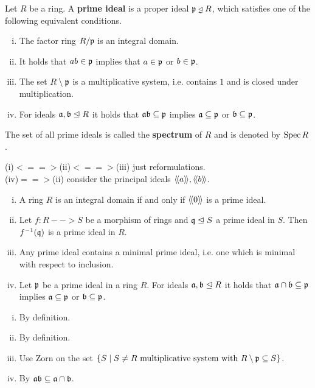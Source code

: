 	\begin{definition}
		Let $R$ be a ring. A \textbf{prime ideal} is a proper ideal $\ideal{p} \divneq R$, which satisfies one of the following equivalent conditions.
		\begin{enumerate}[(i)]
			\item{
				The factor ring $R/\mathfrak{p}$ is an integral domain.
			}
			\item{
				It holds that $ab \in \mathfrak{p}$ implies that $a \in \mathfrak{p}$ or $b \in \mathfrak{p}$.
			}
			\item{
				The set $R \setminus \mathfrak{p}$ is a multiplicative system, i.e. contains $1$ and is closed under multiplication.
			}
			\item{
				For ideals $\mathfrak{a},\mathfrak{b} \trianglelefteq R$ it holds that $\mathfrak{a}\mathfrak{b} \subseteq \mathfrak{p}$ implies $\mathfrak{a} \subseteq \mathfrak{p}$ or $\mathfrak{b} \subseteq \mathfrak{p}$.
			}
		\end{enumerate}
		The set of all prime ideals is called the \textbf{spectrum} of $R$ and is denoted by $\operatorname{Spec} R$.
	\end{definition}
	\begin{sketch}
		(i)$<==>$(ii)$<==>$(iii) just reformulations.\\
		(iv)$==>$(ii) consider the principal ideals $\langle\!\langle a \rangle\!\rangle,\langle\!\langle b \rangle\!\rangle$.
	\end{sketch}

	\begin{lemma}\vspace{-1.5em}
		\begin{enumerate}[(i)]
			\item{
				A ring $R$ is an integral domain if and only if $\langle\!\langle 0 \rangle\!\rangle$ is a prime ideal.
			}
			\item{
				Let $f:R-->S$ be a morphism of rings and $\mathfrak{q} \trianglelefteq S$ a prime ideal in $S$. Then $f^{-1}(\mathfrak{q})$ is a prime ideal in $R$.
			}
			\item{
				Any prime ideal contains a minimal prime ideal, i.e. one which is minimal with respect to inclusion.
			}
			\item{
				Let $\mathfrak{p}$ be a prime ideal in a ring $R$. For ideals $\mathfrak{a},\mathfrak{b} \trianglelefteq R$ it holds that $\mathfrak{a} \cap \mathfrak{b} \subseteq \mathfrak{p}$ implies $\mathfrak{a} \subseteq \mathfrak{p}$ or $\mathfrak{b} \subseteq \mathfrak{p}$.
			}
		\end{enumerate}
	\end{lemma}
	\begin{sketch}
		\begin{enumerate}[(i)]
			\item{
				By definition.
			}
			\item{
				By definition.
			}
			\item{
				Use Zorn on the set $\{S \mid S \neq R \text{ multiplicative system with }R \setminus \mathfrak{p} \subseteq S\}$.
			}
			\item{
				By $\mathfrak{ab} \subseteq \mathfrak{a} \cap \mathfrak{b}$.
			}
			\vspace{-1.8em}
		\end{enumerate}
	\end{sketch}

